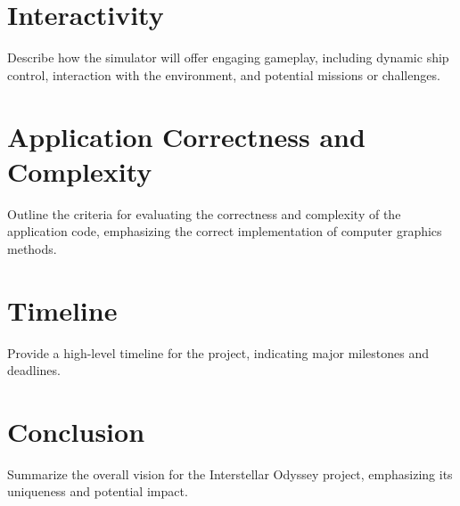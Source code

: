 \documentclass[a4paper,12pt]{article}
\begin{document}
\section*{Interactivity}
Describe how the simulator will offer engaging gameplay, including dynamic ship control, interaction with the environment, and potential missions or challenges.

\section*{Application Correctness and Complexity}
Outline the criteria for evaluating the correctness and complexity of the application code, emphasizing the correct implementation of computer graphics methods.

\section*{Timeline}
Provide a high-level timeline for the project, indicating major milestones and deadlines.

\section*{Conclusion}
Summarize the overall vision for the Interstellar Odyssey project, emphasizing its uniqueness and potential impact.
\end{document}
